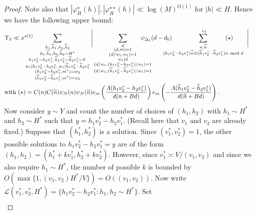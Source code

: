 \documentclass{amsart}
\numberwithin{equation}{section}
\begin{document}
\begin{proof}
\vspace{3mm}
Note also that  $|\varphi_H^\star(h)|, |\varphi_H^{\star\star}(h)| \ll  \log(M)^{O(1)}$ for $|h| \ll H$. 
Hence we have the following upper bound: 
\begin{align*}
&\Upsilon_3 \ll x^{o(1)} \!\!\!\!\!\!\!\!\!\sum_{\substack{h_1, \widetilde{h}_1, h_2, \widetilde{h}_2 \\ h_1,\widetilde{h}_1, h_2,\widetilde{h}_2 \sim H^* \\ h_1v_2^*-h_2v_1^*,\, \widetilde{h}_1v_2^*-\widetilde{h}_2v_1^* \sim Y  \\ w_1 \mid h_1v_2^*-h_2v_1^*, \, w_1 \mid \widetilde{h}_1v_2^*-\widetilde{h}_2v_1^* \\ (h_1v_2^*-h_2v_1^*,m^*) =w_2\\ (\widetilde{h}_1v_2^*-\widetilde{h}_2v_1^*,m^*)=w_2  }}  \Bigg|\sum_{\substack{d  \\  (d,m)=1 \\ (d/w_1,w_1)=1 \\ w_1 \mid d \\
(d/w_1, (h_1v_2^*-h_2v_1^*)/w_1)=1 \\ 
(d/w_1, (\widetilde{h}_1v_2^*-\widetilde{h}_2v_1^*)/w_1)=1
}} \!\!\!\!\!\!\!\!\!\!\!\!\psi_{\Delta_1}(d-d_0) \!\!\!\!\!\!\!\!\!\!\sum_{\substack{n, \widetilde{n} \\ (h_1v_2^*-h_2v_1^*)\widetilde{n} \equiv 
(\widetilde{h}_1v_2^*-\widetilde{h}_2v_1^*)n  \mbox{ \scriptsize mod } d }}^{\,\,*_3} \!\!\!\!\!\!\!\!\!\!\!\!\!\!\!\!\!\! (\star) \quad \,\,\quad\Bigg| \quad   \nonumber \\
&\mbox{with } (\star) =C(n)  C(\widetilde{n})\psi_N(n)\psi_N(\widetilde{n}) e_{m}\left(\dfrac{A (h_1v_2^*-h_2v_1^*) }{d(n+B d)}\right)e_{m}\left(-\dfrac{A (\widetilde{h}_1v_2^*-\widetilde{h}_2v_1^*) }{d(\widetilde{n}+B d)}\right).
\end{align*} 
Now consider $y \sim Y$ and count the number of choices of $(h_1,h_2)$ with $h_1 \sim H^*$ and $h_2 \sim H^*$ such that $y = h_1 v_2^* - h_2 v_1^*$. (Recall here that $v_1$ and $v_2$ are already fixed.) Suppose that $(h_1^*,h_2^*)$ is a solution. Since $(v_1^*,v_2^*)=1$, the other possible solutions to $h_1v_2^*-h_2v_1^*=y$ are of the form $(h_1,h_2)=(h_1^*+kv_1^*,h_2^*+kv_2^*)$. However, since $v_1^* \asymp V/(v_1,v_2)$ and since we also require $h_1 \sim H^*$, the number of possible $k$ is bounded by $O(\max\{1, (v_1,v_2)H^*/V\}) = O((v_1,v_2))$. Now write $\mathcal{L}(v_1^*,v_2^*, H^*) = \{h_1 v_2^* - h_2 v_1^*: h_1, h_2 \sim H^*\}$. Set
\begin{align*}

\end{align*}
\end{proof}
\end{document}
